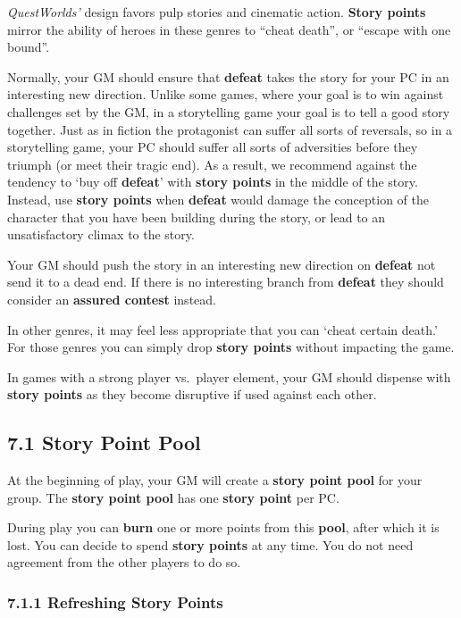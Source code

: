 \documentclass[
  11pt,
]{article}
\begin{document}
\emph{QuestWorlds'} design favors pulp stories and cinematic action.
\textbf{Story points} mirror the ability of heroes in these genres to
``cheat death'', or ``escape with one bound''.

Normally, your GM should ensure that \textbf{defeat} takes the story for
your PC in an interesting new direction. Unlike some games, where your
goal is to win against challenges set by the GM, in a storytelling game
your goal is to tell a good story together. Just as in fiction the
protagonist can suffer all sorts of reversals, so in a storytelling
game, your PC should suffer all sorts of adversities before they triumph
(or meet their tragic end). As a result, we recommend against the
tendency to `buy off \textbf{defeat}' with \textbf{story points} in the
middle of the story. Instead, use \textbf{story points} when
\textbf{defeat} would damage the conception of the character that you
have been building during the story, or lead to an unsatisfactory climax
to the story.

Your GM should push the story in an interesting new direction on
\textbf{defeat} not send it to a dead end. If there is no interesting
branch from \textbf{defeat} they should consider an \textbf{assured
contest} instead.

In other genres, it may feel less appropriate that you can `cheat
certain death.' For those genres you can simply drop \textbf{story
points} without impacting the game.

In games with a strong player vs.~player element, your GM should
dispense with \textbf{story points} as they become disruptive if used
against each other.

\hypertarget{story-point-pool}{%
\subsection{7.1 Story Point Pool}\label{story-point-pool}}

At the beginning of play, your GM will create a \textbf{story point
pool} for your group. The \textbf{story point pool} has one
\textbf{story point} per PC.

During play you can \textbf{burn} one or more points from this
\textbf{pool}, after which it is lost. You can decide to spend
\textbf{story points} at any time. You do not need agreement from the
other players to do so.

\hypertarget{refreshing-story-points}{%
\subsubsection{7.1.1 Refreshing Story
Points}\label{refreshing-story-points}}
\end{document}
